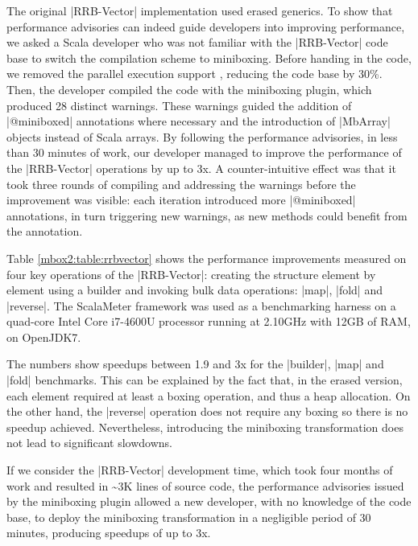 The original |RRB-Vector| implementation used erased generics. To show that performance advisories can indeed guide developers into improving performance, we asked a Scala developer who was not familiar with the |RRB-Vector| code base to switch the compilation scheme to miniboxing. Before handing in the code, we removed the parallel execution support \cite{rrb-vector-miniboxed-impl}, reducing the code base by 30\%. Then, the developer compiled the code with the miniboxing plugin, which produced 28 distinct warnings. These warnings guided the addition of |@miniboxed| annotations where necessary and the introduction of |MbArray| objects instead of Scala arrays. By following the performance advisories, in less than 30 minutes of work, our developer managed to improve the performance of the |RRB-Vector| operations by up to 3x. A counter-intuitive effect was that it took three rounds of compiling and addressing the warnings before the improvement was visible: each iteration introduced more |@miniboxed| annotations, in turn triggering new warnings, as new methods could benefit from the annotation.

Table \ref{mbox2:table:rrbvector} shows the performance improvements measured on four key operations of the |RRB-Vector|: creating the structure element by element using a builder and invoking bulk data operations: |map|, |fold| and |reverse|. The ScalaMeter framework \cite{scalameter} was used as a benchmarking harness on a quad-core Intel Core i7-4600U processor running at 2.10GHz with 12GB of RAM, on OpenJDK7. %

The numbers show speedups between 1.9 and 3x for the |builder|, |map| and |fold| benchmarks. This can be explained by the fact that, in the erased version, each element required at least a boxing operation, and thus a heap allocation. On the other hand, the |reverse| operation does not require any boxing so there is no speedup achieved. Nevertheless, introducing the miniboxing transformation does not lead to significant slowdowns.

If we consider the |RRB-Vector| development time, which took four months of work and resulted in \textasciitilde3K lines of source code, the performance advisories issued by the miniboxing plugin allowed a new developer, with no knowledge of the code base, to deploy the miniboxing transformation in a negligible period of 30 minutes, producing speedups of up to 3x.

